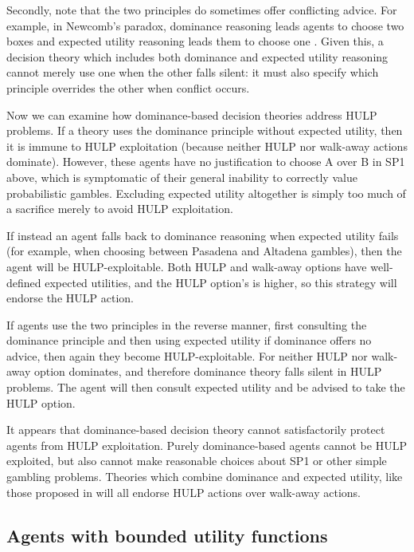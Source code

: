 \documentclass{article}
\begin{document}
Secondly, note that the two principles do sometimes offer conflicting advice. For example, in Newcomb's paradox, dominance reasoning leads agents to choose two boxes and expected utility reasoning leads them to choose one \citep[pg. 110]{resnik1987choices}. Given this, a decision theory which includes both dominance and expected utility reasoning cannot merely use one when the other falls silent: it must also specify which principle overrides the other when conflict occurs.

Now we can examine how dominance-based decision theories address HULP problems. If a theory uses the dominance principle without expected utility, then it is immune to HULP exploitation (because neither HULP nor walk-away actions dominate). However, these agents have no justification to choose A over B in SP1 above, which is symptomatic of their general inability to correctly value probabilistic gambles. Excluding expected utility altogether is simply too much of a sacrifice merely to avoid HULP exploitation.

If instead an agent falls back to dominance reasoning when expected utility fails (for example, when choosing between Pasadena and Altadena gambles), then the agent will be HULP-exploitable. Both HULP and walk-away options have well-defined expected utilities, and the HULP option's is higher, so this strategy will endorse the HULP action.

If agents use the two principles in the reverse manner, first consulting the dominance principle and then using expected utility if dominance offers no advice, then again they become HULP-exploitable. For neither HULP nor walk-away option dominates, and therefore dominance theory falls silent in HULP problems. The agent will then consult expected utility and be advised to take the HULP option.

It appears that dominance-based decision theory cannot satisfactorily protect agents from HULP exploitation. Purely dominance-based agents cannot be HULP exploited, but also cannot make reasonable choices about SP1 or other simple gambling problems. Theories which combine dominance and expected utility, like those proposed in \citet{colyvan2008relative, colyvan2006no,easwaran2009dominance} will all endorse HULP actions over walk-away actions. 

\subsection{Agents with bounded utility functions}
\end{document}
